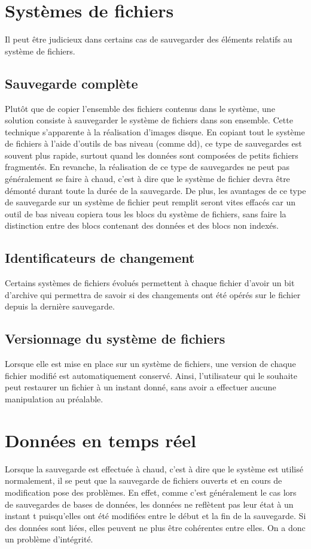 \documentclass[a4paper,11pt]{report}
\begin{document}
\section{Systèmes de fichiers}
Il peut être judicieux dans certains cas de sauvegarder des éléments relatifs au système de fichiers.

\subsection{Sauvegarde complète}
Plutôt que de copier l'ensemble des fichiers contenus dans le système, une solution consiste à sauvegarder le système de fichiers dans son ensemble.
Cette technique s'apparente à la réalisation d'images disque.
En copiant tout le système de fichiers à l'aide d'outils de bas niveau (comme dd), ce type de sauvegardes est souvent plus rapide, surtout quand les données sont composées de petits fichiers fragmentés.
En revanche, la réalisation de ce type de sauvegardes ne peut pas généralement se faire à chaud, c'est à dire que le système de fichier devra être démonté durant toute la durée de la sauvegarde.
De plus, les avantages de ce type de sauvegarde sur un système de fichier peut remplit seront vites effacés car un outil de bas niveau copiera tous les blocs du système de fichiers, sans faire la distinction entre des blocs contenant des données et des blocs non indexés.

\subsection{Identificateurs de changement}
Certains systèmes de fichiers évolués permettent à chaque fichier d'avoir un bit d'archive qui permettra de savoir si des changements ont été opérés sur le fichier depuis la dernière sauvegarde.

\subsection{Versionnage du système de fichiers}
Lorsque elle est mise en place sur un système de fichiers, une version de chaque fichier modifié est automatiquement conservé.
Ainsi, l'utilisateur qui le souhaite peut restaurer un fichier à un instant donné, sans avoir a effectuer aucune manipulation au préalable.

\section{Données en temps réel}
Lorsque la sauvegarde est effectuée à chaud, c'est à dire que le système est utilisé normalement, il se peut que la sauvegarde de fichiers ouverts et en cours de modification pose des problèmes.
En effet, comme c'est généralement le cas lors de sauvegardes de bases de données, les données ne reflètent pas leur état à un instant t puisqu'elles ont été modifiées entre le début et la fin de la sauvegarde.
Si des données sont liées, elles peuvent ne plus être cohérentes entre elles. On a donc un problème d'intégrité.  
\end{document}

